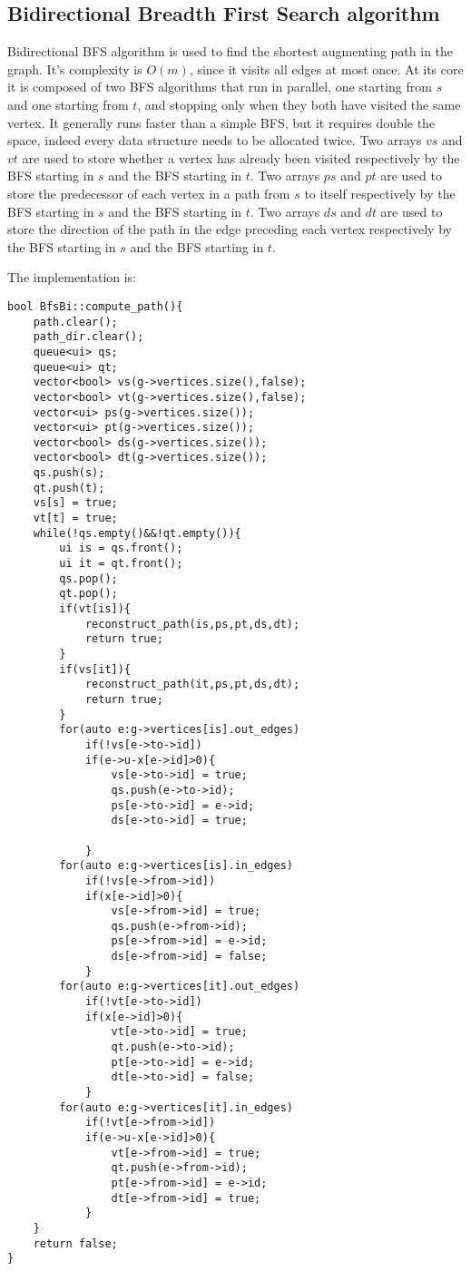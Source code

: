\subsection{Bidirectional Breadth First Search algorithm}
Bidirectional BFS algorithm is used to find the shortest augmenting path in the graph. It's complexity is $O(m)$, since it visits all edges at most once.
At its core it is composed of two BFS algorithms that run in parallel, one starting from $s$ and one starting from $t$,
and stopping only when they both have visited the same vertex. It generally runs faster than a simple BFS, but it requires double the space, indeed every
data structure needs to be allocated twice.
Two arrays $vs$ and $vt$ are used to store whether a vertex has already been visited respectively by the BFS starting in $s$ and the BFS starting in $t$.
Two arrays $ps$ and $pt$ are used to store the predecessor of each vertex in a path from $s$ to itself
respectively by the BFS starting in $s$ and the BFS starting in $t$.
Two arrays $ds$ and $dt$ are used to store the direction of the path in the edge preceding each vertex
respectively by the BFS starting in $s$ and the BFS starting in $t$.

The implementation is:
\begin{verbatim}
bool BfsBi::compute_path(){
	path.clear();
	path_dir.clear();
	queue<ui> qs;
	queue<ui> qt;
	vector<bool> vs(g->vertices.size(),false);
	vector<bool> vt(g->vertices.size(),false);
	vector<ui> ps(g->vertices.size());
	vector<ui> pt(g->vertices.size());
	vector<bool> ds(g->vertices.size());
	vector<bool> dt(g->vertices.size());
	qs.push(s);
	qt.push(t);
	vs[s] = true;
	vt[t] = true;
	while(!qs.empty()&&!qt.empty()){
		ui is = qs.front();
		ui it = qt.front();
		qs.pop();
		qt.pop();
		if(vt[is]){
			reconstruct_path(is,ps,pt,ds,dt);
			return true;
		}
		if(vs[it]){
			reconstruct_path(it,ps,pt,ds,dt);
			return true;
		}
		for(auto e:g->vertices[is].out_edges)
			if(!vs[e->to->id])
			if(e->u-x[e->id]>0){
				vs[e->to->id] = true;
				qs.push(e->to->id);
				ps[e->to->id] = e->id;
				ds[e->to->id] = true;

			}
		for(auto e:g->vertices[is].in_edges)
			if(!vs[e->from->id])
			if(x[e->id]>0){
				vs[e->from->id] = true;
				qs.push(e->from->id);
				ps[e->from->id] = e->id;
				ds[e->from->id] = false;
			}
		for(auto e:g->vertices[it].out_edges)
			if(!vt[e->to->id])
			if(x[e->id]>0){
				vt[e->to->id] = true;
				qt.push(e->to->id);
				pt[e->to->id] = e->id;
				dt[e->to->id] = false;
			}
		for(auto e:g->vertices[it].in_edges)
			if(!vt[e->from->id])
			if(e->u-x[e->id]>0){
				vt[e->from->id] = true;
				qt.push(e->from->id);
				pt[e->from->id] = e->id;
				dt[e->from->id] = true;
			}
	}
	return false;
}
\end{verbatim}


